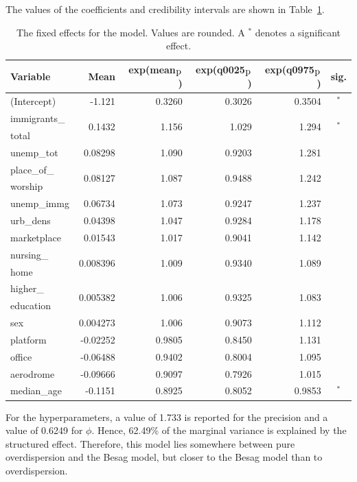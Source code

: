 %     
The values of the coefficients and credibility intervals are shown in Table~\ref{fixedAllNorway_spatial}.
\begin{table}[H]
\caption{The fixed effects for the model. Values are rounded. A $^*$ denotes a significant effect. \label{fixedAllNorway_spatial}}
\begin{tabular}{l r r r r c}
\toprule
\textbf{Variable}	& \textbf{Mean}	& \textbf{exp(mean$_{\hbox{p}}$)} & \textbf{exp(q0025$_{\hbox{p}}$)} & \textbf{exp(q0975$_{\hbox{p}}$)} & \textbf{sig.}\\
\midrule
(Intercept) & -1.121 & 0.3260 & 0.3026 & 0.3504 & $^*$ \\
immigrants\_ & \multirow{2}{*}{0.1432} & \multirow{2}{*}{1.156} & \multirow{2}{*}{1.029} & \multirow{2}{*}{1.294} & \multirow{2}{*}{$^*$} \\
total \\
unemp\_tot & 0.08298 & 1.090 & 0.9203 & 1.281 \\
place\_of\_ & \multirow{2}{*}{0.08127} & \multirow{2}{*}{1.087} & \multirow{2}{*}{0.9488} & \multirow{2}{*}{1.242} \\
worship \\
unemp\_immg & 0.06734 & 1.073 & 0.9247 & 1.237 & \\
urb\_dens & 0.04398 & 1.047 & 0.9284 & 1.178 \\
marketplace & 0.01543 & 1.017 & 0.9041 & 1.142 \\
nursing\_ & \multirow{2}{*}{0.008396} & \multirow{2}{*}{1.009} & \multirow{2}{*}{0.9340} & \multirow{2}{*}{1.089} \\
home \\
higher\_ & \multirow{2}{*}{0.005382} & \multirow{2}{*}{1.006} & \multirow{2}{*}{0.9325} & \multirow{2}{*}{1.083} \\
education\\
sex & 0.004273 & 1.006 & 0.9073 & 1.112\\
platform & -0.02252 & 0.9805 & 0.8450 & 1.131 \\
office & -0.06488 & 0.9402 & 0.8004 & 1.095 \\
aerodrome & -0.09666 & 0.9097 & 0.7926 & 1.015 \\
median\_age & -0.1151  & 0.8925 & 0.8052 & 0.9853 & $^*$ \\
\bottomrule
\end{tabular}
\end{table}
\clearpage
For the hyperparameters, a value of 1.733 is reported for the precision and a value of 0.6249 for $\phi$. Hence, 62.49\% of the marginal variance is explained by the structured effect. Therefore, this model lies somewhere between pure overdispersion and the Besag model, but closer to the Besag model than to overdispersion.
\clearpage
